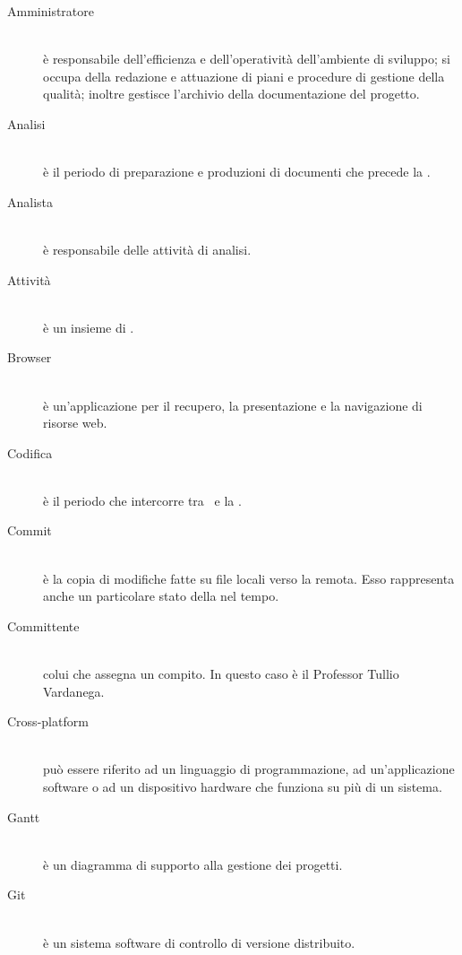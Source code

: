 \documentclass[12pt,a4paper]{article}
\begin{document}
\begin{description}

\item[Amministratore] 
\hfill\\ è responsabile dell'efficienza e dell'operatività dell'ambiente di sviluppo; si occupa della redazione e attuazione di piani e procedure di gestione della qualità; inoltre gestisce l'archivio della documentazione del progetto.

\item[Analisi]
\hfill\\ è il periodo di preparazione e produzioni di documenti che precede la \RR.

\item[Analista]
\hfill\\ è responsabile delle attività di analisi.

\item[Attività]
\hfill\\ è un insieme di .

\item[Browser]
\hfill\\ è un'applicazione per il recupero, la presentazione e la navigazione di risorse web.

\item[Codifica] 
\hfill\\ è il periodo che intercorre tra \RP\ e la \RQ.

\item[Commit] 
\hfill\\ è la copia di modifiche fatte su file locali verso la  remota. Esso rappresenta anche un particolare stato della  nel tempo.

\item[Committente] 
\hfill\\ colui che assegna un compito. In questo caso è il Professor Tullio Vardanega.

\item[Cross-platform] 
\hfill\\ può essere riferito ad un linguaggio di programmazione, ad un'applicazione software o ad un dispositivo hardware che funziona su più di un sistema.

\item[Gantt] 
\hfill\\ è un diagramma di supporto alla gestione dei progetti.

\item[Git] 
\hfill\\ è un sistema software di controllo di versione distribuito.


\end{description}
\end{document}

